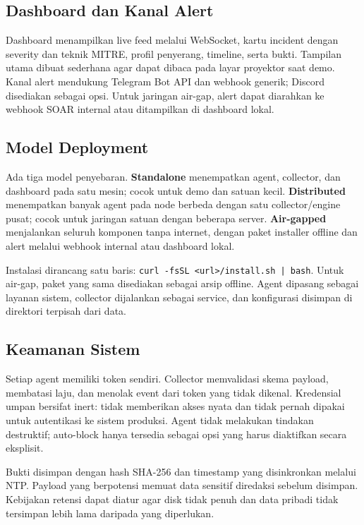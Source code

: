 \documentclass[12pt,a4paper]{article}
\begin{document}
\subsection{Dashboard dan Kanal Alert}

Dashboard menampilkan live feed melalui WebSocket, kartu incident dengan severity dan teknik MITRE, profil penyerang, timeline, serta bukti. Tampilan utama dibuat sederhana agar dapat dibaca pada layar proyektor saat demo. Kanal alert mendukung Telegram Bot API dan webhook generik; Discord disediakan sebagai opsi. Untuk jaringan air-gap, alert dapat diarahkan ke webhook SOAR internal atau ditampilkan di dashboard lokal.

\subsection{Model Deployment}

Ada tiga model penyebaran. \textbf{Standalone} menempatkan agent, collector, dan dashboard pada satu mesin; cocok untuk demo dan satuan kecil. \textbf{Distributed} menempatkan banyak agent pada node berbeda dengan satu collector/engine pusat; cocok untuk jaringan satuan dengan beberapa server. \textbf{Air-gapped} menjalankan seluruh komponen tanpa internet, dengan paket installer offline dan alert melalui webhook internal atau dashboard lokal.

Instalasi dirancang satu baris: \texttt{curl -fsSL <url>/install.sh | bash}. Untuk air-gap, paket yang sama disediakan sebagai arsip offline. Agent dipasang sebagai layanan sistem, collector dijalankan sebagai service, dan konfigurasi disimpan di direktori terpisah dari data.

\subsection{Keamanan Sistem}

Setiap agent memiliki token sendiri. Collector memvalidasi skema payload, membatasi laju, dan menolak event dari token yang tidak dikenal. Kredensial umpan bersifat inert: tidak memberikan akses nyata dan tidak pernah dipakai untuk autentikasi ke sistem produksi. Agent tidak melakukan tindakan destruktif; auto-block hanya tersedia sebagai opsi yang harus diaktifkan secara eksplisit.

Bukti disimpan dengan hash SHA-256 dan timestamp yang disinkronkan melalui NTP. Payload yang berpotensi memuat data sensitif diredaksi sebelum disimpan. Kebijakan retensi dapat diatur agar disk tidak penuh dan data pribadi tidak tersimpan lebih lama daripada yang diperlukan.
\end{document}
